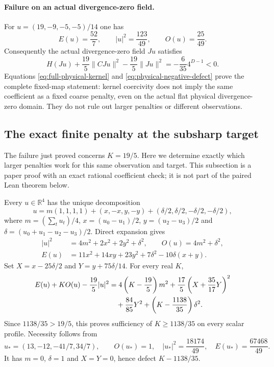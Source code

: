 \paragraph{Failure on an actual divergence-zero field.}
For $u=(19,-9,-5,-5)/14$ one has
\[
 E(u)=\frac{52}{7},\qquad |u|^2=\frac{123}{49},\qquad
 O(u)=\frac{25}{49}.
\]
Consequently the actual divergence-zero field $Ju$ satisfies
\begin{equation}\label{eq:physical-negative-defect}
 H(Ju)+\frac{19}{5}\|CJu\|^2-\frac{19}{5}\|Ju\|^2
       =-\frac{6}{35}4^{D-1}<0.
\end{equation}
Equations \eqref{eq:full-physical-kernel} and
\eqref{eq:physical-negative-defect} prove the complete fixed-map statement:
kernel coercivity does not imply the same coefficient as a fixed coarse
penalty, even on the actual flat physical divergence-zero domain.
They do not rule out larger penalties or different observations.

\subsection{The exact finite penalty at the subsharp target}
The failure just proved concerns $K=19/5$. Here we determine exactly
which larger penalties work for this same observation and target.
This subsection is a paper proof with an exact rational coefficient
check; it is not part of the paired Lean theorem below.

Every $u\in\mathbb R^4$ has the unique decomposition
\[
 u=m(1,1,1,1)+(x,-x,y,-y)
       +(\delta/2,\delta/2,-\delta/2,-\delta/2),
\]
where $m=(\sum_tu_t)/4$, $x=(u_0-u_1)/2$, $y=(u_2-u_3)/2$
and $\delta=(u_0+u_1-u_2-u_3)/2$. Direct expansion gives
\begin{align*}
 |u|^2&=4m^2+2x^2+2y^2+\delta^2,\qquad O(u)=4m^2+\delta^2,\\
 E(u)&=11x^2+14xy+23y^2+7\delta^2-10\delta(x+y).
\end{align*}
Set $X=x-25\delta/2$ and $Y=y+75\delta/14$. For every real $K$,
\begin{align}
 E(u)+KO(u)-\frac{19}{5}|u|^2
 &=4\left(K-\frac{19}{5}\right)m^2
   +\frac{17}{5}\left(X+\frac{35}{17}Y\right)^2\notag\\
 &\quad+\frac{84}{85}Y^2
   +\left(K-\frac{1138}{35}\right)\delta^2.
 \label{eq:exact-subsharp-square}
\end{align}
Since $1138/35>19/5$, this proves sufficiency of $K\geq1138/35$
on every scalar profile. Necessity follows from
\[
 u_*=(13,-12,-41/7,34/7),\qquad
 O(u_*)=1,\quad |u_*|^2=\frac{18174}{49},\quad
 E(u_*)=\frac{67468}{49}.
\]
It has $m=0$, $\delta=1$ and $X=Y=0$, hence defect $K-1138/35$.

